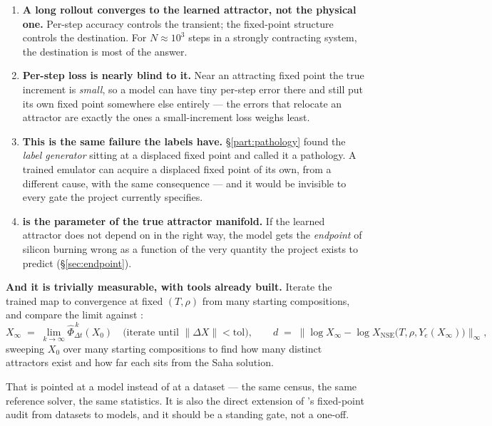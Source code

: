 \begin{enumerate}
\item \textbf{A long rollout converges to the learned attractor, not the
  physical one.} Per-step accuracy controls the transient; the fixed-point
  structure controls the destination. For $N \approx 10^{3}$ steps in a strongly
  contracting system, the destination is most of the answer.
\item \textbf{Per-step loss is nearly blind to it.} Near an attracting fixed
  point the true increment is \emph{small}, so a model can have tiny per-step
  error there and still put its own fixed point somewhere else entirely --- the
  errors that relocate an attractor are exactly the ones a small-increment loss
  weighs least.
\item \textbf{This is the same failure the labels have.} \S\ref{part:pathology}
  found the \emph{label generator} sitting at a displaced fixed point and called
  it a pathology. A trained emulator can acquire a displaced fixed point of its
  own, from a different cause, with the same consequence --- and it would be
  invisible to every gate the project currently specifies.
\item \textbf{\Ye{} is the parameter of the true attractor manifold.} If the
  learned attractor does not depend on \Ye{} in the right way, the model gets
  the \emph{endpoint} of silicon burning wrong as a function of the very
  quantity the project exists to predict (\S\ref{sec:endpoint}).
\end{enumerate}

\textbf{And it is trivially measurable, with tools already built.} Iterate the
trained map to convergence at fixed $(T,\rho)$ from many starting compositions,
and compare the limit against :
%
\begin{equation}
\label{eq:fixedpointcensus}
X_\infty \;=\; \lim_{k\to\infty}\hat\Phi_{\Delta t}^{\,k}(X_0)
\quad\text{(iterate until } \|\Delta X\| < \mathrm{tol}\text{)},
\qquad
d \;=\; \big\|\log X_\infty - \log X_{\mathrm{NSE}}\big(T,\rho,Y_e(X_\infty)\big)\big\|_\infty ,
\end{equation}
%
sweeping $X_0$ over many starting compositions to find how many distinct
attractors exist and how far each sits from the Saha solution.

That is  pointed at a model instead
of at a dataset --- the same census, the same reference solver, the same
statistics. It is also the direct extension of 's fixed-point audit
from datasets to models, and it should be a standing gate, not a one-off.

